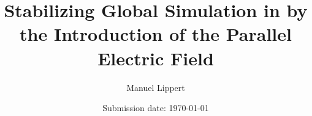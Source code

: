 \titlehead{
    \centering
    \texttt{[image: Uni\_Logo\_white\_black.png]}
}

\subject{\normalfont Master Thesis}
\title{Stabilizing Global Simulation in \gkw by the Introduction of the Parallel Electric Field \boldmath{$\Epar$}}
\author{Manuel Lippert}
\date{Submission date: \today}
\publishers{\textbf{Physics Department at the University of Bayreuth}\\
\vspace*{2em}
Supervisors:\\
Prof.\,Arthur\,G.\,Peeters\\
Dr.\,Florian\,Rath
}